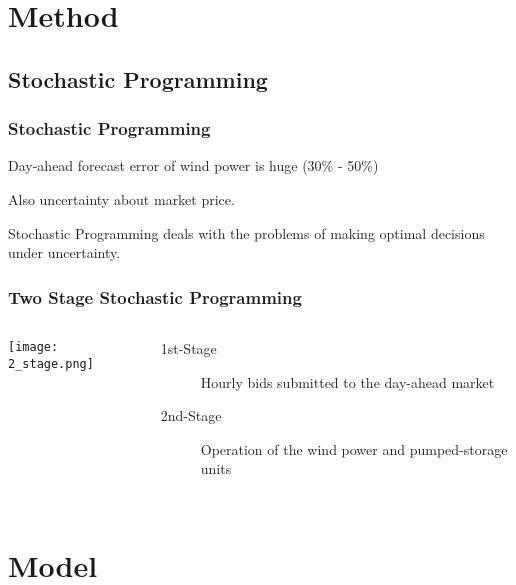 \section{Method}
\subsection{Stochastic Programming}
\begin{frame}
\frametitle{Stochastic Programming}
\begin{tcolorbox}[colback=red!5,colframe=red!40!black,title= Uncertainty]
Day-ahead forecast error of wind power is huge (30\% - 50\%)

Also uncertainty about market price.
\end{tcolorbox}
\begin{tcolorbox}[colback=green!5,colframe=green!40!black,title= Solution - Stochastic Programming]
Stochastic Programming deals with the problems of making optimal decisions under uncertainty.
\end{tcolorbox}
\end{frame}

\begin{frame}
\frametitle{Two Stage Stochastic Programming}
\begin{columns}
  \texttt{[image: 2\_stage.png]}
\begin{description}
\item[1st-Stage] Hourly bids submitted to the day-ahead market
\item[2nd-Stage] Operation of the wind power and pumped-storage units
\end{description}
\end{columns}
\end{frame}



\section{Model}
